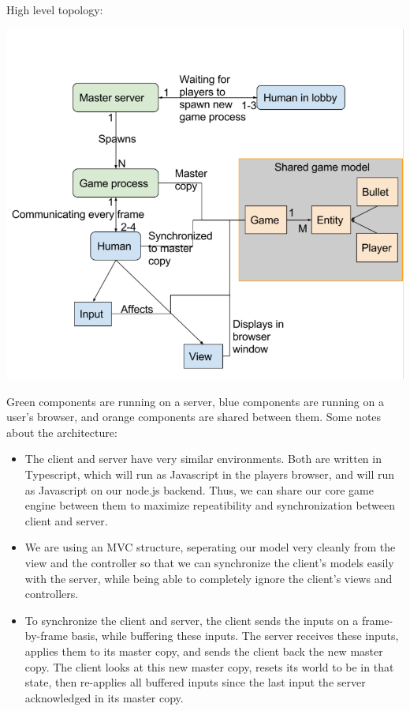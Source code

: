 \documentclass[11pt, oneside]{article}   	%
\begin{document}
High level topology:\\
\begin{center}
\includegraphics[scale=0.7]{images/architecture.png}
\end{center}
Green components are running on a server, blue components are running on a user's browser, and orange components are shared between them. Some notes about the architecture:
\begin{itemize}
  \item The client and server have very similar environments.
Both are written in Typescript, which will run as Javascript in the players browser, and will run as Javascript on our node.js backend.
Thus, we can share our core game engine between them to maximize repeatibility and synchronization between client and server.
  \item We are using an MVC structure, seperating our model very cleanly from the
view and the controller so that we can synchronize the client's models easily
with the server, while being able to completely ignore the client's views and controllers.
  \item To synchronize the client and server, the client sends the inputs on a frame-by-frame basis, while buffering these inputs.
The server receives these inputs, applies them to its master copy, and sends the client back the new master copy.
The client looks at this new master copy, resets its world to be in that state, then re-applies all buffered inputs since the last input the server acknowledged in its master copy.
\end{itemize}
\end{document}
